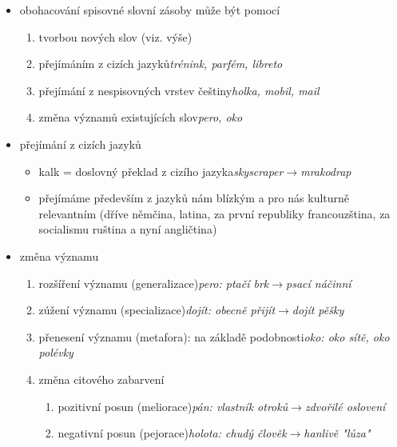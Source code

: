 \documentclass{memoir}
\begin{document}
 	\begin{itemize}
 		\item obohacování spisovné slovní zásoby může být pomocí
 		\begin{enumerate}
 			\item tvorbou nových slov (viz. výše)
 			\item přejímáním z cizích jazyků\hfill\textit{trénink, parfém, libreto}
 			\item přejímání z nespisovných vrstev češtiny\hfill\textit{holka, mobil, mail}
 			\item změna významů existujících slov\hfill\textit{pero, oko}
 		\end{enumerate}
 		\item přejímání z cizích jazyků
 		\begin{itemize}
 			\item kalk = doslovný překlad z cizího jazyka\hfill\textit{skyscraper$\rightarrow$mrakodrap}
 			\item přejímáme především z jazyků nám blízkým a pro nás kulturně relevantním (dříve němčina, latina, za první republiky francouzština, za socialismu ruština a nyní angličtina)
 		\end{itemize}
 		\item změna významu
 		\begin{enumerate}
 			\item rozšíření významu (generalizace)\hfill\textit{pero: ptačí brk$\rightarrow$psací náčinní}
 			\item zúžení významu (specializace)\hfill\textit{dojít: obecně přijít$\rightarrow$dojít pěšky}
 			\item přenesení významu (metafora): na základě podobnosti\hfill\textit{oko: oko sítě, oko polévky}
 			\item změna citového zabarvení
 			\begin{enumerate}
 				\item pozitivní posun (meliorace)\hfill\textit{pán: vlastník otroků$\rightarrow$zdvořilé oslovení}
 				\item negativní posun (pejorace)\hfill\textit{holota: chudý člověk$\rightarrow$hanlivě "lůza"}
 			\end{enumerate}
 		\end{enumerate}
 	\end{itemize}
\end{document}
